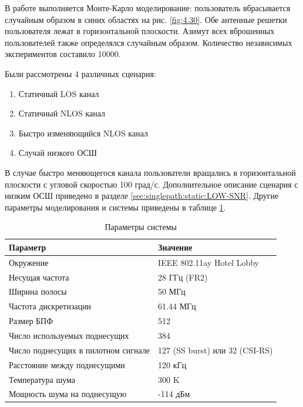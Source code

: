 В работе выполняется  Монте-Карло моделирование: пользователь вбрасывается
случайным образом в синих областях на рис. \ref{fig:4.30}.
Обе антенные решетки пользователя лежат в горизонтальной плоскости.
Азимут всех вброшенных пользователей также определялся случайным образом.
Количество независимых экспериментов составило 10000.

Были рассмотрены 4 различных сценария:
\begin{enumerate}
  \item Статичный LOS канал
  \item Статичный NLOS канал
  \item Быстро изменяющийся NLOS канал
  \item Случай низкого ОСШ
\end{enumerate}

В случае быстро меняющегося канала пользователи вращались в горизонтальной
плоскости с угловой скоростью 100 град/с. Дополнительное описание
сценария с низким ОСШ приведено в разделе \ref{sec:singlepath:static:LOW-SNR}.
Другие параметры моделирования и системы приведены в таблице \ref{tab:4.10}.

\begin{table}
  \centering
  \caption{Параметры системы}
  \label{tab:4.10}
  \begin{tabular}{ll}
    \toprule
    \textbf{Параметр}                   & \textbf{Значение}              \\
    \midrule
    Окружение                           & IEEE 802.11ay Hotel Lobby      \\
    Несущая частота                     & 28 ГГц (FR2)                   \\
    Ширина полосы                       & 50 МГц                         \\
    Частота дискретизации               & 61.44 МГц                      \\
    Размер БПФ                          & 512                            \\
    Число используемых поднесущих       & 384                            \\
    Число поднесущих в пилотном сигнале & 127 (SS burst) или 32 (CSI-RS) \\
    Расстояние между поднесущими        & 120 кГц                        \\
    Температура шума                    & 300 K                          \\
    Мощность шума на поднесущую         & -114 дБм                       \\
    \bottomrule
  \end{tabular}
\end{table}

